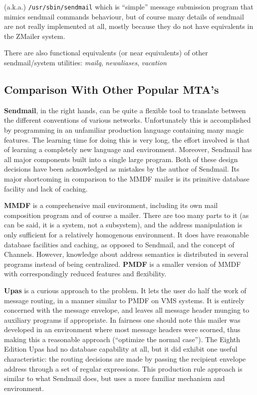 (a.k.a.) {\tt /usr/sbin/sendmail}
which is ``simple'' message submission program that mimics sendmail
commands behaviour, but of course many details of sendmail are
not really implemented at all, mostly because they do not have
equivalents in the ZMailer system.

There are also functional equivalents (or near equivalents) of
other sendmail/system utilities:  {\em mailq\/}, {\em newaliases\/}, {\em vacation\/}




\subsection{Comparison With Other Popular MTA's}

{\bf Sendmail}, in the right hands, can be quite a flexible tool to translate
between the different conventions of various networks.  Unfortunately this
is accomplished by programming in an unfamiliar production language
containing many magic features.  The learning time for doing this is very
long, the effort involved is that of learning a completely new language and
environment. Moreover, Sendmail has all major components built into a
single large program. Both of these design decisions have been acknowledged
as mistakes by the author of Sendmail.  Its major shortcoming in comparison
to the MMDF mailer is its primitive database facility and lack of caching.

{\bf MMDF} is a comprehensive mail environment, including its own mail
composition program and of course a mailer.  There are too many parts to it
(as can be said, it is a system, not a subsystem), and the address
manipulation is only sufficient for a relatively homogenous environment. It
does have reasonable database facilities and caching, as opposed to
Sendmail, and the concept of Channels.  However, knowledge about address
semantics is distributed in several programs instead of being centralized.
{\bf PMDF} is a smaller version of MMDF with correspondingly reduced features and
flexibility.

{\bf Upas} is a curious approach to the problem. It lets the user do half the
work of message routing, in a manner similar to PMDF on VMS systems. It is
entirely concerned with the message envelope, and leaves all message header
munging to auxiliary programs if appropriate. In fairness one should note
this mailer was developed in an environment where most message headers were
scorned, thus making this a reasonable approach (``optimize the normal
case''). The Eighth Edition Upas had no database capability at all, but it
did exhibit one useful characteristic: the routing decisions are made by
passing the recipient envelope address through a set of regular
expressions. This production rule approach is similar to what Sendmail
does, but uses a more familiar mechanism and environment.

